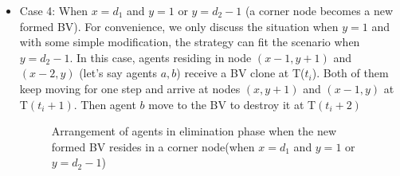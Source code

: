 \begin{itemize}
\item Case 4: When $x=d_1$ and $y=1$ or $y=d_2-1$ (a corner node becomes a new formed BV). For convenience, we only discuss the situation when $y=1$ and with some simple modification, the strategy can fit the scenario when $y=d_2-1$.  In this case, agents residing in node $(x-1, y+1)$ and $(x-2, y)$ (let's say agents $a,b$) receive a BV clone at T($t_i$). Both of them keep moving for one step and arrive at nodes $(x, y+1)$ and $(x-1, y)$ at T$(t_i+1)$. Then agent $b$ move to the BV to destroy it at T$(t_i+2)$
\begin{figure} [H]
  \centering 
 \hspace{1in} 
    \caption{Arrangement of agents in elimination phase when the new formed BV resides in a corner node(when $x=d_1$ and $y=1$ or $y=d_2-1$)} 
  \label{fig:casefour} %
\end{figure}
\end{itemize}

